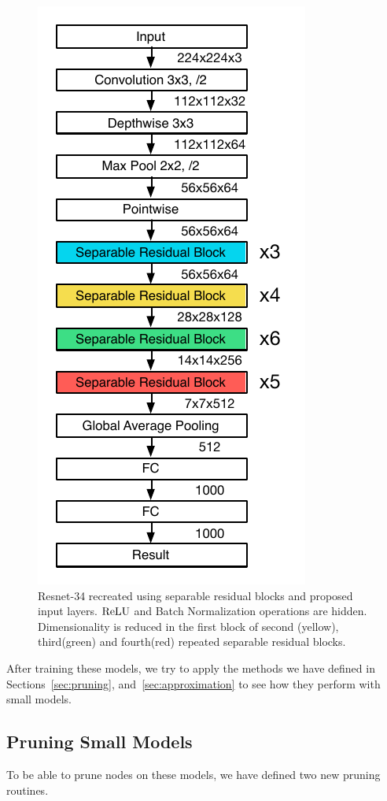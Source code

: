 \begin{figure}
\vspace{-65px}
  \begin{center}
        \includegraphics{images/separable_resnet.pdf}
  \end{center}
  \caption{Resnet-34 recreated using separable residual blocks and proposed input layers. $\textrm{ReLU}$ and Batch Normalization operations are hidden. Dimensionality is reduced in the first block of second (yellow), third(green) and fourth(red) repeated separable residual blocks.}
  \label{fig:model}
\end{figure}

After training these models, we try to apply the methods we have defined in Sections~\ref{sec:pruning}, and~\ref{sec:approximation} to see how they perform with small models.
\subsection{Pruning Small Models}
To be able to prune nodes on these models, we have defined two new pruning routines.
